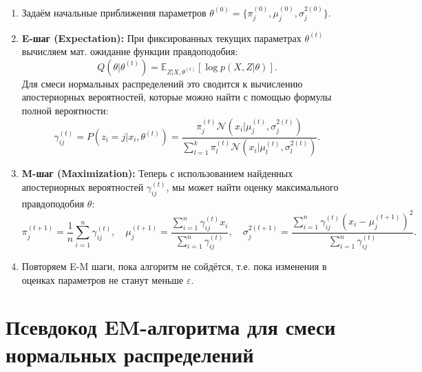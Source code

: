 \begin{enumerate}
    \item Задаём начальные приближения параметров $\theta^{(0)} = \{\pi_j^{(0)}, \mu_j^{(0)}, \sigma_j^{2(0)}\}$.
    \item \textbf{E-шаг (Expectation):} При фиксированных текущих параметрах $\theta^{(t)}$ вычисляем мат. ожидание функции правдоподобия:
          \[
              Q(\theta|\theta^{(t)}) = \mathbb{E}_{Z|X,\theta^{(t)}}[\log p(X,Z|\theta)].
          \]
          Для смеси нормальных распределений это сводится к вычислению апостериорных вероятностей, которые можно найти с помощью формулы полной вероятности:
          \[
              \gamma_{ij}^{(t)} = P(z_i = j | x_i, \theta^{(t)}) = \frac{\pi_j^{(t)}\mathcal{N}(x_i|\mu_j^{(t)},\sigma_j^{2(t)})}{\sum_{l=1}^k \pi_l^{(t)}\mathcal{N}(x_i|\mu_l^{(t)},\sigma_l^{2(t)})}.
          \]

    \item \textbf{M-шаг (Maximization):} Теперь с использованием найденных апостериорных вероятностей $\gamma_{ij}^{(t)}$, мы может найти оценку максимального правдоподобия $\theta$:
          \[
              \pi_j^{(t+1)} = \frac{1}{n}\sum_{i=1}^n \gamma_{ij}^{(t)},\quad
              \mu_j^{(t+1)} = \frac{\sum_{i=1}^n \gamma_{ij}^{(t)} x_i}{\sum_{i=1}^n \gamma_{ij}^{(t)}},\quad
              \sigma_j^{2(t+1)} = \frac{\sum_{i=1}^n \gamma_{ij}^{(t)} (x_i - \mu_j^{(t+1)})^2}{\sum_{i=1}^n \gamma_{ij}^{(t)}}.
          \]

    \item Повторяем E-M шаги, пока алгоритм не сойдётся, т.е. пока изменения в оценках параметров не станут меньше $\varepsilon$.
\end{enumerate}

\section*{\textbf{Псевдокод EM-алгоритма для смеси нормальных распределений}}



